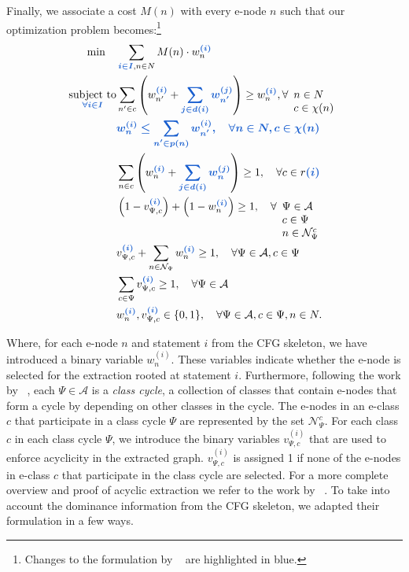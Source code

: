 Finally, we associate a cost $M(n)$ with every e-node $n$ such that our optimization problem becomes:\footnote{Changes to the formulation by \citeauthor{heImprovingTermExtraction2017}~\cite{heImprovingTermExtraction2017} are highlighted in blue.}
\begin{align}
\min \quad & \sum_{\highlight{i \in I}, n \in N} M(n) \cdot w_n^{\highlight{(i)}}\nonumber
\\
\underset{\highlight{\forall i \in I}}{\text{subject to}}
& \sum_{n' \in c}\left( w^{\highlight{(i)}}_{n'} + \highlight{\sum_{j \in d(i)} w_{n'}^{(j)}}  \right) \ge w_n^{\highlight{(i)}}, \forall \begin{array}[t]{l} n \in N \\ c \in \chi(n) \end{array}
\\
& \highlight{w^{(i)}_{n} \le \sum_{n' \in p(n)} w^{(i)}_{n'}, \quad \forall n \in N, c \in \chi(n)}
\\
& \sum_{n \in c} \left( w_n^{\highlight{(i)}} + \highlight{\sum_{j\in d(i)}{w_n^{(j)}}} \right) \geq 1, \quad \forall c \in r\highlight{(i)}
\\
& \left(1 - v_{\Psi,c}^{\highlight{(i)}}\right) + \left(1 - w_n^{\highlight{(i)}}\right) \geq 1, \quad \forall  \begin{array}[t]{l} \Psi \in \mathcal{A} \\ c \in \Psi \\ n \in \mathcal{N}_{\Psi}^{c} \end{array}\nonumber
\\
& v_{\Psi,c}^{\highlight{(i)}} + \sum_{n \in \mathcal{N}_{\Psi}} w_n^{\highlight{(i)}} \geq 1, \quad \forall \Psi \in \mathcal{A}, c \in \Psi\nonumber
\\
& \sum_{c \in \Psi} v_{\Psi,c}^{\highlight{(i)}} \geq 1, \quad \forall \Psi \in \mathcal{A}\nonumber
\\
& w_n^{\highlight{(i)}}, v_{\Psi,c}^{\highlight{(i)}} \in \{0, 1\}, \quad \forall \Psi \in \mathcal{A}, c \in \Psi, n \in N\nonumber.
\end{align}

Where, for each e-node $n$ and statement $i$ from the CFG skeleton, we have introduced a binary variable $w_n^{(i)}$.
These variables indicate whether the e-node is selected for the extraction rooted at statement $i$.
Furthermore, following the work by \citeauthor{heImprovingTermExtraction2017}~\cite{heImprovingTermExtraction2017}, each $\Psi \in \mathcal{A}$ is a \emph{class cycle}, a collection of classes that contain e-nodes that form a cycle by depending on other classes in the cycle.
The e-nodes in an e-class $c$ that participate in a class cycle $\Psi$ are represented by the set $\mathcal{N}_{\Psi}^{c}$.
For each class $c$ in each class cycle $\Psi$, we introduce the binary variables $v_{\Psi,c}^{(i)}$ that are used to enforce acyclicity in the extracted graph.
$v_{\Psi,c}^{(i)}$ is assigned 1 if none of the e-nodes in e-class $c$ that participate in the class cycle are selected.
For a more complete overview and proof of acyclic extraction we refer to the work by \citeauthor{heImprovingTermExtraction2017}~\cite{heImprovingTermExtraction2017}.
To take into account the dominance information from the CFG skeleton, we adapted their formulation in a few ways.

